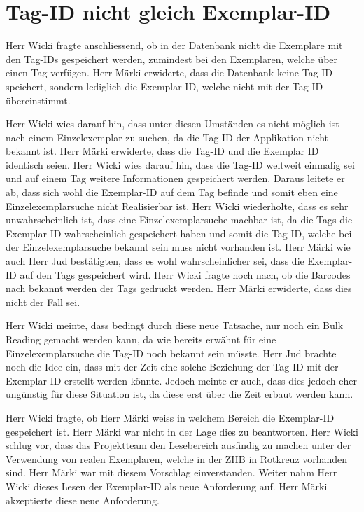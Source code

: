 \documentclass[parskip=full, a4paper]{scrreprt}
\begin{document}
\section{Tag-ID nicht gleich Exemplar-ID}
\label{result:noSingleTagReachable}
Herr Wicki fragte anschliessend, ob in der Datenbank nicht die Exemplare mit den Tag-IDs gespeichert werden, zumindest bei den Exemplaren, welche über einen Tag verfügen. Herr Märki erwiderte, dass die Datenbank keine Tag-ID speichert, sondern lediglich die Exemplar ID, welche nicht mit der Tag-ID übereinstimmt.

Herr Wicki wies darauf hin, dass unter diesen Umständen es nicht möglich ist nach einem Einzelexemplar zu suchen, da die Tag-ID der Applikation nicht bekannt ist. Herr Märki erwiderte, dass die Tag-ID und die Exemplar ID identisch seien. Herr Wicki wies darauf hin, dass die Tag-ID weltweit einmalig sei und auf einem Tag weitere Informationen gespeichert werden. Daraus leitete er ab, dass sich wohl die Exemplar-ID auf dem Tag befinde und somit eben eine Einzelexemplarsuche nicht Realisierbar ist. Herr Wicki wiederholte, dass es sehr unwahrscheinlich ist, dass eine Einzelexemplarsuche machbar ist, da die Tags die Exemplar ID wahrscheinlich gespeichert haben und somit die Tag-ID, welche bei der Einzelexemplarsuche bekannt sein muss nicht vorhanden ist. Herr Märki wie auch Herr Jud bestätigten, dass es wohl wahrscheinlicher sei, dass die Exemplar-ID auf den Tags gespeichert wird. Herr Wicki fragte noch nach, ob die Barcodes nach bekannt werden der Tags gedruckt werden. Herr Märki erwiderte, dass dies nicht der Fall sei.

Herr Wicki meinte, dass bedingt durch diese neue Tatsache, nur noch ein Bulk Reading gemacht werden kann, da wie bereits erwähnt für eine Einzelexemplarsuche die Tag-ID noch bekannt sein müsste. Herr Jud brachte noch die Idee ein, dass mit der Zeit eine solche Beziehung der Tag-ID mit der Exemplar-ID erstellt werden könnte. Jedoch meinte er auch, dass dies jedoch eher ungünstig für diese Situation ist, da diese erst über die Zeit erbaut werden kann.

Herr Wicki fragte, ob Herr Märki weiss in welchem Bereich die Exemplar-ID gespeichert ist. Herr Märki war nicht in der Lage dies zu beantworten. Herr Wicki schlug vor, dass das Projektteam den Lesebereich ausfindig zu machen unter der Verwendung von realen Exemplaren, welche in der ZHB in Rotkreuz vorhanden sind. Herr Märki war mit diesem Vorschlag einverstanden. Weiter nahm Herr Wicki dieses Lesen der Exemplar-ID als neue Anforderung auf. Herr Märki akzeptierte diese neue Anforderung.
\end{document}
